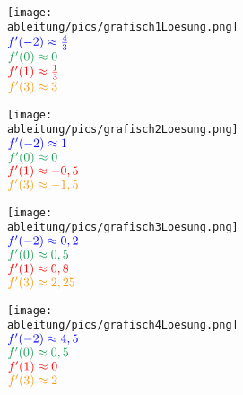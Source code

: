 \begin{Answer}[ref=grafischABlA1]\\
	\begin{minipage}{\textwidth}
		\begin{minipage}{0.5\textwidth}
			\centering\texttt{[image: \\ableitung/pics/grafisch1Loesung.png]}\\
			\(\textcolor{blue}{f'(-2)\approx\frac{4}{3}}\)\\
			\(\textcolor{ForestGreen}{f'(0)\approx0}\)\\
			\(\textcolor{red}{f'(1)\approx\frac{1}{3}}\)\\
			\(\textcolor{YellowOrange}{f'(3)\approx 3}\)\\
		\end{minipage}%
		\begin{minipage}{0.5\textwidth}
			\centering\texttt{[image: \\ableitung/pics/grafisch2Loesung.png]}\\
			\(\textcolor{blue}{f'(-2)\approx1}\)\\
			\(\textcolor{ForestGreen}{f'(0)\approx0}\)\\
			\(\textcolor{red}{f'(1)\approx-0,5}\)\\
			\(\textcolor{YellowOrange}{f'(3)\approx-1,5}\)\\
		\end{minipage}%
	\end{minipage}%


	\begin{minipage}{\textwidth}
		\begin{minipage}{0.5\textwidth}
			\centering\texttt{[image: \\ableitung/pics/grafisch3Loesung.png]}\\
			\(\textcolor{blue}{f'(-2)\approx0,2}\)\\
			\(\textcolor{ForestGreen}{f'(0)\approx0,5}\)\\
			\(\textcolor{red}{f'(1)\approx0,8}\)\\
			\(\textcolor{YellowOrange}{f'(3)\approx2,25}\)\\
		\end{minipage}%
		\begin{minipage}{0.5\textwidth}
			\centering\texttt{[image: \\ableitung/pics/grafisch4Loesung.png]}\\
			\(\textcolor{blue}{f'(-2)\approx4,5}\)\\
			\(\textcolor{ForestGreen}{f'(0)\approx0,5}\)\\
			\(\textcolor{red}{f'(1)\approx0}\)\\
			\(\textcolor{YellowOrange}{f'(3)\approx2}\)\\
		\end{minipage}%
	\end{minipage}%
\end{Answer}